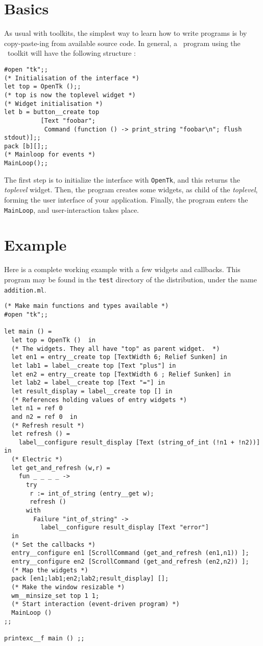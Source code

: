 \section{Basics}
As usual with toolkits, the simplest way to learn how to write programs is
by copy-paste-ing from available source code. In general, a \caml\ program
using the \tk\ toolkit will have the following structure :
\begin{verbatim}
#open "tk";;
(* Initialisation of the interface *)
let top = OpenTk ();;
(* top is now the toplevel widget *)
(* Widget initialisation *)
let b = button__create top 
          [Text "foobar"; 
           Command (function () -> print_string "foobar\n"; flush stdout)];;
pack [b][];;
(* Mainloop for events *)
MainLoop();;
\end{verbatim} 

The first step is to initialize the interface with \verb|OpenTk|, and this
returns the {\em toplevel} widget.
Then, the program creates some widgets, as child of the {\em toplevel},
forming the user interface of your application. Finally, the program enters
the \verb|MainLoop|, and user-interaction takes place.

\section{Example}
Here is a complete working example with a few widgets and callbacks.
This program may be found in the \verb|test| directory of the distribution,
under the name \verb|addition.ml|.

\begin{verbatim}
(* Make main functions and types available *)
#open "tk";;

let main () =
  let top = OpenTk ()  in
  (* The widgets. They all have "top" as parent widget.  *)
  let en1 = entry__create top [TextWidth 6; Relief Sunken] in
  let lab1 = label__create top [Text "plus"] in
  let en2 = entry__create top [TextWidth 6 ; Relief Sunken] in
  let lab2 = label__create top [Text "="] in
  let result_display = label__create top [] in
  (* References holding values of entry widgets *)
  let n1 = ref 0
  and n2 = ref 0  in
  (* Refresh result *)
  let refresh () =
    label__configure result_display [Text (string_of_int (!n1 + !n2))]  in
  (* Electric *)
  let get_and_refresh (w,r) =
    fun _ _ _ _ ->
      try
       r := int_of_string (entry__get w);
       refresh ()
      with
        Failure "int_of_string" ->
          label__configure result_display [Text "error"]
  in
  (* Set the callbacks *)
  entry__configure en1 [ScrollCommand (get_and_refresh (en1,n1)) ];
  entry__configure en2 [ScrollCommand (get_and_refresh (en2,n2)) ];
  (* Map the widgets *)
  pack [en1;lab1;en2;lab2;result_display] [];
  (* Make the window resizable *)
  wm__minsize_set top 1 1;
  (* Start interaction (event-driven program) *)
  MainLoop ()
;;

printexc__f main () ;;
\end{verbatim}


